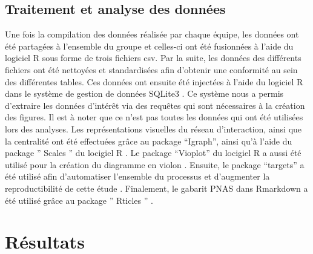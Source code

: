 \documentclass[preprint, 3p,
authoryear]{elsarticle} %
\begin{document}
\hypertarget{traitement-et-analyse-des-donnuxe9es}{%
\subsection{Traitement et analyse des
données}\label{traitement-et-analyse-des-donnuxe9es}}

Une fois la compilation des données réalisée par chaque équipe, les
données ont été partagées à l'ensemble du groupe et celles-ci ont été
fusionnées à l'aide du logiciel R sous forme de trois fichiers csv. Par
la suite, les données des différents fichiers ont été nettoyées et
standardisées afin d'obtenir une conformité au sein des différentes
tables. Ces données ont ensuite été injectées à l'aide du logiciel R
dans le système de gestion de données SQLite3
\citep{muller_rsqlite_2023}. Ce système nous a permis d'extraire les
données d'intérêt via des requêtes qui sont nécessaires à la création
des figures. Il est à noter que ce n'est pas toutes les données qui ont
été utilisées lors des analyses. Les représentations visuelles du réseau
d'interaction, ainsi que la centralité ont été effectuées grâce au
package ``Igraph'', ainsi qu'à l'aide du package '' Scales '' du
locigiel R \citep{csardi_igraph_2023, wickham_scales_2022}. Le package
``Vioplot'' du locigiel R a aussi été utilisé pour la création du
diagramme en violon \citep{adler_vioplot_2022}. Ensuite, le package
``targets'' a été utilisé afin d'automatiser l'ensemble du processus et
d'augmenter la reproductibilité de cette étude
\citep{landau_tarchetypes_2023, landau_targets_2023}. Finalement, le
gabarit PNAS dans Rmarkdown a été utilisé grâce au package '' Rticles ''
\citep{allaire_rticles_2022}.

\hypertarget{ruxe9sultats}{%
\section{Résultats}\label{ruxe9sultats}}

\hypertarget{section}{%
\section{}\label{section}}
\end{document}
